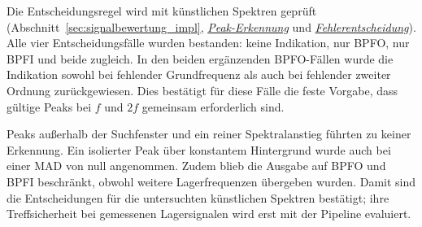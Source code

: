 
Die Entscheidungsregel wird mit künstlichen Spektren geprüft
(Abschnitt~\ref{sec:signalbewertung_impl},
\hyperref[subsec:peaks_impl]{\emph{Peak-Erkennung}} und
\hyperref[subsec:fehlerentscheidung_impl]{\emph{Fehlerentscheidung}}).
Alle vier
Entscheidungsfälle wurden bestanden: keine Indikation, nur BPFO, nur BPFI
und beide zugleich. In den beiden ergänzenden BPFO-Fällen wurde die
Indikation sowohl bei fehlender Grundfrequenz als auch bei fehlender zweiter
Ordnung zurückgewiesen. Dies bestätigt für diese Fälle die feste Vorgabe,
dass gültige Peaks bei $f$ und $2f$ gemeinsam erforderlich sind.

Peaks außerhalb der Suchfenster und ein reiner Spektralanstieg führten zu
keiner Erkennung. Ein isolierter Peak über konstantem Hintergrund wurde auch
bei einer MAD von null angenommen. Zudem blieb die Ausgabe auf BPFO und BPFI
beschränkt, obwohl weitere Lagerfrequenzen übergeben wurden. Damit sind die
Entscheidungen für die untersuchten künstlichen Spektren bestätigt; ihre
Treffsicherheit bei gemessenen Lagersignalen wird erst mit der Pipeline
evaluiert.

